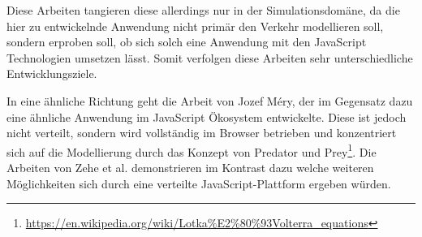 Diese Arbeiten tangieren diese allerdings nur in der Simulationsdomäne, da die hier zu entwickelnde Anwendung nicht primär den Verkehr modellieren soll, sondern erproben soll, ob sich solch eine Anwendung mit den JavaScript Technologien umsetzen lässt.
Somit verfolgen diese Arbeiten sehr unterschiedliche Entwicklungsziele.

In eine ähnliche Richtung geht die Arbeit von Jozef Méry\autocite{mery2020}, der im Gegensatz dazu eine ähnliche Anwendung im JavaScript Ökosystem entwickelte.
Diese ist jedoch nicht verteilt, sondern wird vollständig im Browser betrieben und konzentriert sich auf die Modellierung durch das Konzept von Predator und Prey\footnote{\url{https://en.wikipedia.org/wiki/Lotka\%E2\%80\%93Volterra_equations}}.
Die Arbeiten von Zehe et al.\autocite{zehe2013} demonstrieren im Kontrast dazu welche weiteren Möglichkeiten sich durch eine verteilte JavaScript-Plattform ergeben würden.

